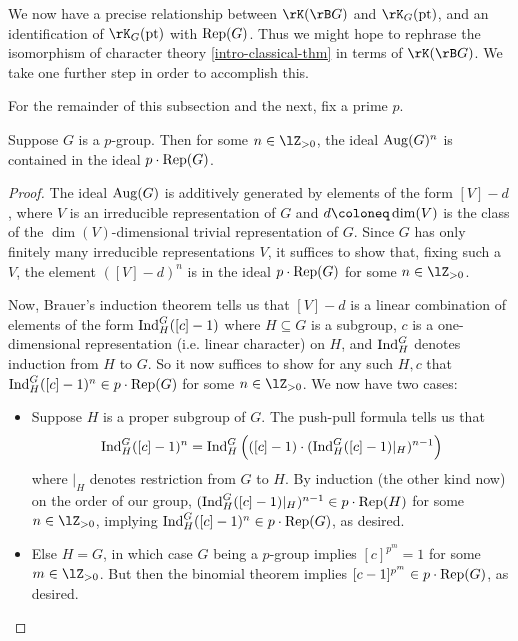 We now have a precise relationship between $\rK(\rB G)$ and
$\rK_G(\pt)$, and an identification of $\rK_G(\pt)$ with
$\operatorname{Rep}(G)$. Thus we might hope to rephrase the isomorphism of character
theory \cref{intro-classical-thm} in terms of $\rK(\rB G)$. We take
one further step in order to accomplish this.

\begin{notation}
  \label{intro-fixp}
  For the remainder of this subsection and the next, fix a prime $p$.
\end{notation}

\begin{lemma}
  \label{intro-ideals}
  Suppose $G$ is a $p$-group. Then for some $n \in \lZ_{> 0}$, the
  ideal $\operatorname{Aug}(G)^n$ is contained in the ideal $p \cdot \operatorname{Rep}(G)$.
\end{lemma}

\begin{proof}
  The ideal $\operatorname{Aug}(G)$ is additively generated by elements of the form
  $[V] - d$, where $V$ is an irreducible representation of $G$ and
  $d \ce \dim(V)$ is the class of the $\dim(V)$-dimensional trivial
  representation of $G$. Since $G$ has only finitely many irreducible
  representations $V$, it suffices to show that, fixing such a $V$,
  the element $([V] - d)^n$ is in the ideal $p \cdot \operatorname{Rep}(G)$ for some
  $n \in \lZ_{> 0}$.

  Now, Brauer's induction theorem tells us that $[V]-d$ is a linear
  combination of elements of the form $\operatorname{Ind}_H^G([c]-1)$ where
  $H \subseteq G$ is a subgroup, $c$ is a one-dimensional
  representation (i.e. linear character) on $H$, and $\operatorname{Ind}_H^G$
  denotes induction from $H$ to $G$. So it now suffices to show for
  any such $H,c$ that $\operatorname{Ind}_H^G([c]-1)^n \in p \cdot \operatorname{Rep}(G)$ for some
  $n \in \lZ_{> 0}$. We now have two cases:
  \begin{itemize}
  \item Suppose $H$ is a proper subgroup of $G$. The push-pull formula
    tells us that
    \[
    \operatorname{Ind}_H^G([c]-1)^n = \operatorname{Ind}_H^G\left(([c]-1) \cdot
    (\operatorname{Ind}_H^G([c]-1)|_H)^{n-1}\right)
    \]
    where $|_H$ denotes restriction from $G$ to $H$. By induction (the
    other kind now) on the order of our group,
    $(\operatorname{Ind}_H^G([c]-1)|_H)^{n-1} \in p \cdot \operatorname{Rep}(H)$ for some
    $n \in \lZ_{> 0}$, implying
    $\operatorname{Ind}_H^G([c]-1)^n \in p \cdot \operatorname{Rep}(G)$, as desired.
  \item Else $H = G$, in which case $G$ being a $p$-group implies
    $[c]^{p^m} = 1$ for some $m \in \lZ_{> 0}$. But then the binomial
    theorem implies $[c-1]^{p^m} \in p \cdot \operatorname{Rep}(G)$, as
    desired. \qedhere
  \end{itemize}
\end{proof}

